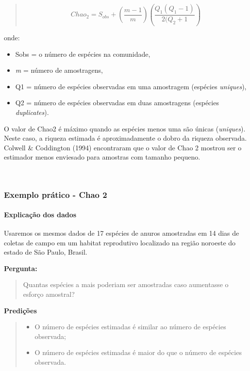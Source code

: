 \documentclass[
]{book}
\providecommand{\tightlist}{%
  \setlength{\itemsep}{0pt}\setlength{\parskip}{0pt}}
\begin{document}
\begin{quote}
\[Chao_{2} = S_{obs} + \left(\frac{m-1}{m}\right)\left(\frac{Q_1(Q_1-1)}{2(Q_2 + 1}\right)\]
\end{quote}

onde:

\begin{itemize}
\item
  Sobs = o número de espécies na comunidade,
\item
  \emph{m} = número de amostragens,
\item
  Q1 = número de espécies observadas em uma amostragem (espécies \emph{uniques}),
\item
  Q2 = número de espécies observadas em duas amostragens (espécies \emph{duplicates}).
\end{itemize}

O valor de Chao2 é máximo quando as espécies menos uma são únicas (\emph{uniques}). Neste caso, a riqueza estimada é aproximadamente o dobro da riqueza observada. Colwell \& Coddington (1994) encontraram que o valor de Chao 2 mostrou ser o estimador menos enviesado para amostras com tamanho pequeno.

~

\hypertarget{exemplo-pruxe1tico---chao-2}{%
\subsubsection{Exemplo prático - Chao 2}\label{exemplo-pruxe1tico---chao-2}}

\hypertarget{explicauxe7uxe3o-dos-dados-2}{%
\paragraph{Explicação dos dados}\label{explicauxe7uxe3o-dos-dados-2}}

Usaremos os mesmos dados de 17 espécies de anuros amostradas em 14 dias de coletas de campo em um habitat reprodutivo localizado na região noroeste do estado de São Paulo, Brasil.

\textbf{Pergunta:}

\begin{quote}
Quantas espécies a mais poderiam ser amostradas caso aumentasse o esforço amostral?
\end{quote}

\textbf{Predições}

\begin{quote}
\begin{itemize}
\tightlist
\item
  O número de espécies estimadas é similar ao número de espécies observada;
\item
  O número de espécies estimadas é maior do que o número de espécies observada.
\end{itemize}
\end{quote}
\end{document}
